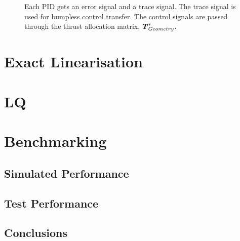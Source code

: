 \begin{figure}
    
    \caption{Each PID gets an error signal and a trace signal. The trace signal is used for bumpless control transfer. The control signals are passed through the thrust allocation matrix, $\thrusterGeometryOnes[*]$.} 
    \label{fig:dec_pid}
\end{figure}

\section{Exact Linearisation}

\section{LQ}


\section{Benchmarking}
\subsection{Simulated Performance}
\subsection{Test Performance}
\subsection{Conclusions}
